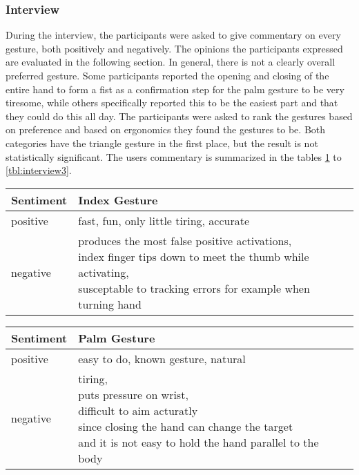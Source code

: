 \subsubsection{Interview}
During the interview, the participants were asked to give commentary on every gesture, both positively and negatively. The opinions the participants expressed are evaluated in the following section. In general, there is not a clearly overall preferred gesture. Some participants reported the opening and closing of the entire hand to form a fist as a confirmation step for the palm gesture to be very tiresome, while others specifically reported this to be the easiest part and that they could do this all day. The participants were asked to rank the gestures based on preference and based on ergonomics they found the gestures to be. Both categories have the triangle gesture in the first place, but the result is not statistically significant. The users commentary is summarized in the tables \ref{tbl:interview1} to \ref{tbl:interview3}. 

\begin{table}[]
\centering
\begin{tabular}{llll}
\hline
Sentiment &
    Index Gesture \\ \hline
positive &
    fast, fun, only little tiring, accurate  \\ \hline
negative &
    \makecell{produces the most false positive activations, \\index finger tips down to meet the thumb while activating, \\susceptable to tracking errors for example when turning hand} \\ \hline
\end{tabular}%
\label{tbl:interview1}
\end{table}

\begin{table}[]
\centering
\begin{tabular}{llll}
\hline
Sentiment &
    Palm Gesture \\ \hline
positive &
    easy to do, known gesture, natural \\ \hline
negative &
    \makecell{tiring,\\ puts pressure on wrist,\\ difficult to aim acturatly \\ since closing the hand can change the target\\ and it is not easy to hold the hand parallel to the body} \\ \hline
\end{tabular}%
\label{tbl:interview2}
\end{table}

